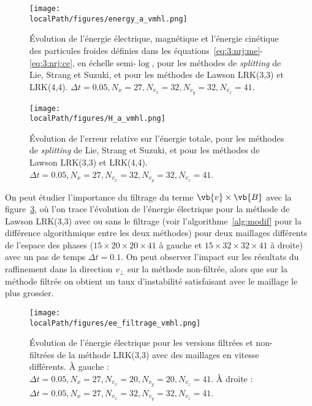 \begin{figure}[h]
  \centering
  \texttt{[image: \\localPath/figures/energy\_a\_vmhl.png]}
  \caption{Évolution de l'énergie électrique, magnétique et l'énergie cinétique des particules froides définies dans les équations~\ref{eq:3:nrj:me}-\ref{eq:3:nrj:ce}, en échelle semi-$\log$, pour les méthodes de \emph{splitting} de Lie, Strang et Suzuki, et pour les méthodes de Lawson LRK(3,3) et LRK(4,4). $\Delta t = 0.05, N_x=27, N_{v_x}=32, N_{v_y}=32, N_{v_z}=41$.}
  \label{fig:energies4d}
\end{figure}

\begin{figure}[h]
  \centering
  \texttt{[image: \\localPath/figures/H\_a\_vmhl.png]}
  \caption{Évolution de l'erreur relative sur l'énergie totale, pour les méthodes de \emph{splitting} de Lie, Strang et Suzuki, et pour les méthodes de Lawson LRK(3,3) et LRK(4,4). $\Delta t = 0.05, N_x=27, N_{v_x}=32, N_{v_y}=32, N_{v_z}=41$.}
  \label{fig:energy_tot4d}
\end{figure}

On peut étudier l'importance du filtrage du terme $\vb{v}\times\vb{B}$ avec la figure~\ref{fig:compar_ee4d}, où l'on trace l'évolution de l'énergie électrique pour la méthode de Lawson LRK(3,3) avec ou sans le filtrage (voir l'algorithme~\ref{alg:modif} pour la différence algorithmique entre les deux méthodes) pour deux maillages différents de l'espace des phases ($15\times20\times20\times41$ à gauche et $15\times32\times32\times41$ à droite) avec un pas de temps $\Delta t = 0.1$. On peut observer l'impact sur les résultats du raffinement dans la direction $v_\perp$ sur la méthode non-filtrée, alors que sur la méthode filtrée on obtient un taux d'instabilité satisfaisant avec le maillage le plus grossier.

\begin{figure}[h]
  \centering
  \texttt{[image: \\localPath/figures/ee\_filtrage\_vmhl.png]}
  \caption{Évolution de l'énergie électrique pour les versions filtrées et non-filtrées de la méthode LRK(3,3) avec des maillages en vitesse différents. À gauche : $\Delta t = 0.05, N_x=27, N_{v_x}=20, N_{v_y}=20, N_{v_z}=41$. À droite : $\Delta t = 0.05, N_x=27, N_{v_x}=32, N_{v_y}=32, N_{v_z}=41$.}
  \label{fig:compar_ee4d}
\end{figure}



\FloatBarrier
